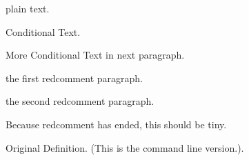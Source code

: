 \documentclass[12pt]{article}
\begin{document}
 
plain text.
 
\newcommand{\Redcomment}[1]{Original Definition. (#1).}
 
\begin{conditional}
Conditional Text.
 
More Conditional Text in next paragraph.
 
\renewcommand{\Redcomment}[1]{Redefinition Worked! (#1).}
\end{conditional}
 
\begin{redcomment}
the first redcomment paragraph.
 
the second redcomment paragraph.
\end{redcomment}
 
Because redcomment has ended, this should be tiny.
 
\Redcomment{This is the command line version.}
 
\end{document}
